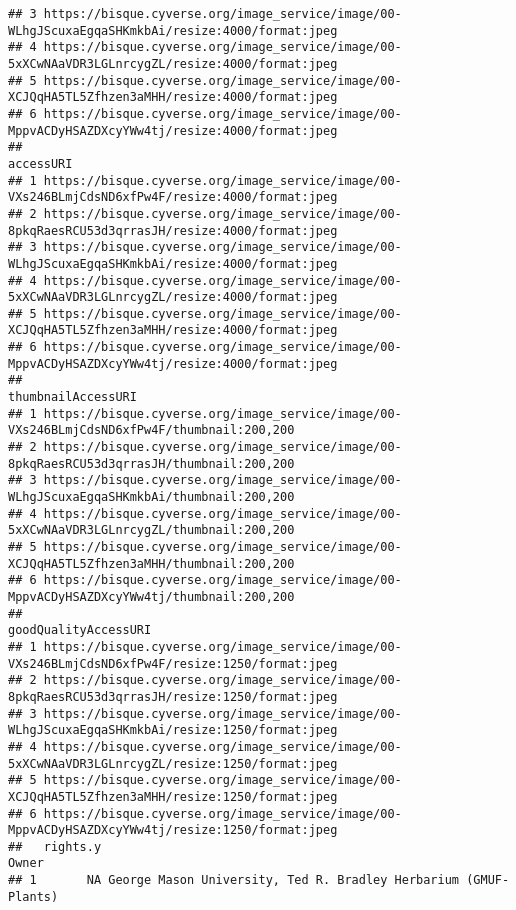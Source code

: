 \documentclass[
]{article}
\begin{document}
\begin{verbatim}
## 3 https://bisque.cyverse.org/image_service/image/00-WLhgJScuxaEgqaSHKmkbAi/resize:4000/format:jpeg
## 4 https://bisque.cyverse.org/image_service/image/00-5xXCwNAaVDR3LGLnrcygZL/resize:4000/format:jpeg
## 5 https://bisque.cyverse.org/image_service/image/00-XCJQqHA5TL5Zfhzen3aMHH/resize:4000/format:jpeg
## 6 https://bisque.cyverse.org/image_service/image/00-MppvACDyHSAZDXcyYWw4tj/resize:4000/format:jpeg
##                                                                                          accessURI
## 1 https://bisque.cyverse.org/image_service/image/00-VXs246BLmjCdsND6xfPw4F/resize:4000/format:jpeg
## 2 https://bisque.cyverse.org/image_service/image/00-8pkqRaesRCU53d3qrrasJH/resize:4000/format:jpeg
## 3 https://bisque.cyverse.org/image_service/image/00-WLhgJScuxaEgqaSHKmkbAi/resize:4000/format:jpeg
## 4 https://bisque.cyverse.org/image_service/image/00-5xXCwNAaVDR3LGLnrcygZL/resize:4000/format:jpeg
## 5 https://bisque.cyverse.org/image_service/image/00-XCJQqHA5TL5Zfhzen3aMHH/resize:4000/format:jpeg
## 6 https://bisque.cyverse.org/image_service/image/00-MppvACDyHSAZDXcyYWw4tj/resize:4000/format:jpeg
##                                                                           thumbnailAccessURI
## 1 https://bisque.cyverse.org/image_service/image/00-VXs246BLmjCdsND6xfPw4F/thumbnail:200,200
## 2 https://bisque.cyverse.org/image_service/image/00-8pkqRaesRCU53d3qrrasJH/thumbnail:200,200
## 3 https://bisque.cyverse.org/image_service/image/00-WLhgJScuxaEgqaSHKmkbAi/thumbnail:200,200
## 4 https://bisque.cyverse.org/image_service/image/00-5xXCwNAaVDR3LGLnrcygZL/thumbnail:200,200
## 5 https://bisque.cyverse.org/image_service/image/00-XCJQqHA5TL5Zfhzen3aMHH/thumbnail:200,200
## 6 https://bisque.cyverse.org/image_service/image/00-MppvACDyHSAZDXcyYWw4tj/thumbnail:200,200
##                                                                               goodQualityAccessURI
## 1 https://bisque.cyverse.org/image_service/image/00-VXs246BLmjCdsND6xfPw4F/resize:1250/format:jpeg
## 2 https://bisque.cyverse.org/image_service/image/00-8pkqRaesRCU53d3qrrasJH/resize:1250/format:jpeg
## 3 https://bisque.cyverse.org/image_service/image/00-WLhgJScuxaEgqaSHKmkbAi/resize:1250/format:jpeg
## 4 https://bisque.cyverse.org/image_service/image/00-5xXCwNAaVDR3LGLnrcygZL/resize:1250/format:jpeg
## 5 https://bisque.cyverse.org/image_service/image/00-XCJQqHA5TL5Zfhzen3aMHH/resize:1250/format:jpeg
## 6 https://bisque.cyverse.org/image_service/image/00-MppvACDyHSAZDXcyYWw4tj/resize:1250/format:jpeg
##   rights.y                                                           Owner
## 1       NA George Mason University, Ted R. Bradley Herbarium (GMUF-Plants)

\end{verbatim}
\end{document}
